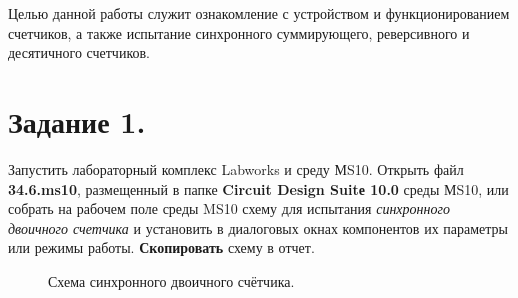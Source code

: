 \documentclass[spec, och, otchet, hidelinks]{SCWorks}
\begin{document}


\tableofcontents






\intro

Целью данной работы служит ознакомление с устройством и функционированием счетчиков, а также испытание синхронного суммирующего, реверсивного и 
десятичного счетчиков.

\newpage

\section*{Задание 1.}

Запустить лабораторный комплекс Labworks и среду МS10. Открыть файл \textbf{34.6.ms10}, размещенный в папке \textbf{Circuit Design Suitе 10.0} среды 
МS10, или собрать на рабочем поле среды MS10 схему для испытания \textit{синхронного двоичного счетчика} и установить в диалоговых окнах компонентов 
их параметры или режимы работы. \textbf{Скопировать} схему в отчет.

\begin{figure}[h]
	\caption{Схема синхронного двоичного счётчика.}
\end{figure}
\end{document}
